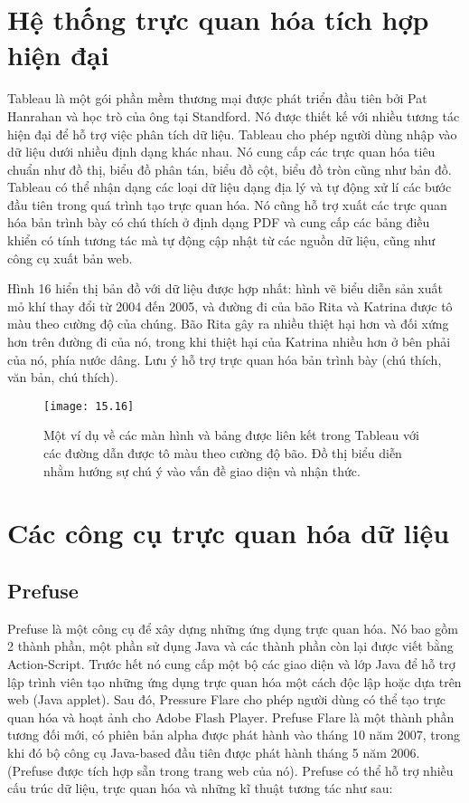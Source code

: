 \documentclass[13pt]{scrartcl} %
\begin{document}
\section{Hệ thống trực quan hóa tích hợp hiện đại}
Tableau là một gói phần mềm thương mại được phát triển đầu tiên bởi Pat Hanrahan và học trò của ông tại Standford. Nó được thiết kế với nhiều tương tác hiện đại để hỗ trợ việc phân tích dữ liệu. Tableau cho phép người dùng nhập vào dữ liệu dưới nhiều định dạng khác nhau. Nó cung cấp các trực quan hóa tiêu chuẩn như đồ thị, biểu đồ phân tán, biểu đồ cột, biểu đồ tròn cũng như bản đồ. Tableau có thể nhận dạng các loại dữ liệu dạng địa lý và tự động xử lí các bước đầu tiên trong quá trình tạo trực quan hóa. Nó cũng hỗ trợ xuất các trực quan hóa bản trình bày có chú thích ở định dạng PDF và cung cấp các bảng điều khiển có tính tương tác mà tự động cập nhật từ các nguồn dữ liệu, cũng như công cụ xuất bản web.

Hình 16 hiển thị bản đồ với dữ liệu được hợp nhất: hình vẽ biểu diễn sản xuất mỏ khí thay đổi từ 2004 đến 2005, và đường đi của bão Rita và Katrina được tô màu theo cường độ của chúng. Bão Rita gây ra nhiều thiệt hại hơn và đối xứng hơn trên đường đi của nó, trong khi thiệt hại của Katrina nhiều hơn ở bên phải của nó, phía nước dâng. Lưu ý hỗ trợ trực quan hóa bản trình bày (chú thích, văn bản, chú thích).

\begin{figure}[!ht]
    \centering
    \texttt{[image: 15.16]}
    \caption{Một ví dụ về các màn hình và bảng được liên kết trong Tableau với các đường dẫn được tô màu theo cường độ bão. Đồ thị biểu diễn nhằm hướng sự chú ý vào vấn đề giao diện và nhận thức. }
\end{figure}
\section{Các công cụ trực quan hóa dữ liệu}
\subsection{Prefuse}
Prefuse là một công cụ để xây dựng những ứng dụng trực quan hóa. Nó bao gồm 2 thành phần, một phần sử dụng Java và các thành phần còn lại được viết bằng Action-Script. Trước hết nó cung cấp một bộ các giao diện và lớp Java để hỗ trợ lập trình viên tạo những ứng dụng trực quan hóa một cách độc lập hoặc dựa trên web (Java applet). Sau đó, Pressure Flare cho phép người dùng có thể tạo trực quan hóa và hoạt ảnh cho Adobe Flash Player. Prefuse Flare là một thành phần tương đối mới, có phiên bản alpha được phát hành vào tháng 10 năm 2007, trong khi đó bộ công cụ Java-based đầu tiên được phát hành tháng 5 năm 2006. (Prefuse được tích hợp sẵn trong trang web của nó). Prefuse có thể hỗ trợ nhiều cấu trúc dữ liệu, trực quan hóa và những kĩ thuật tương tác như sau:
\end{document}
